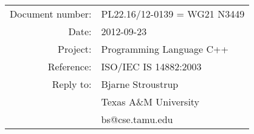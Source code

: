 \documentclass[12pt,a4paper]{article}
\begin{document}
\thispagestyle{empty}

\begin{tabular}{rl}
Document number:&PL22.16/12-0139 = WG21 N3449\\
Date:           &2012-09-23                  \\
Project:        &Programming Language C++    \\
Reference:      &ISO/IEC IS 14882:2003       \\
Reply to:       &Bjarne Stroustrup           \\
                &Texas A\&M University       \\
                &bs@cse.tamu.edu             \\
\hline
\end{tabular}
\end{document}
